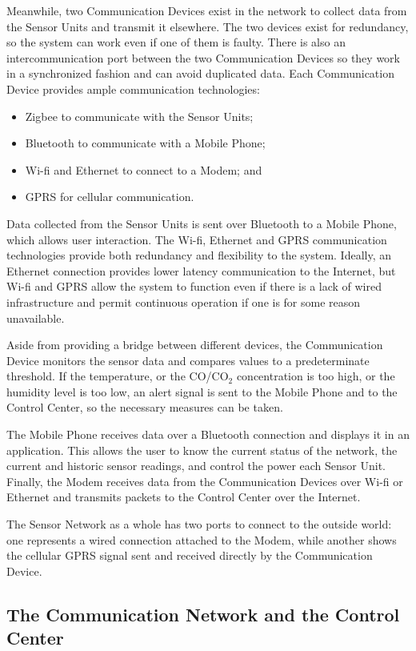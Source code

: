 Meanwhile, two Communication Devices exist in the network to collect data from the Sensor Units and transmit it elsewhere. The two devices exist for redundancy, so the system can work even if one of them is faulty. There is also an intercommunication port between the two Communication Devices so they work in a synchronized fashion and can avoid duplicated data. Each Communication Device provides ample communication technologies: 
\begin{itemize}
	\item Zigbee to communicate with the Sensor Units;
	\item Bluetooth to communicate with a Mobile Phone;
	\item Wi-fi and Ethernet to connect to a Modem; and
	\item GPRS for cellular communication.
\end{itemize}

Data collected from the Sensor Units is sent over Bluetooth to a Mobile Phone, which allows user interaction. The Wi-fi, Ethernet and GPRS communication technologies provide both redundancy and flexibility to the system. Ideally, an Ethernet connection provides lower latency communication to the Internet, but Wi-fi and GPRS allow the system to function even if there is a lack of wired infrastructure and permit continuous operation if one is for some reason unavailable.

Aside from providing a bridge between different devices, the Communication Device monitors the sensor data and compares values to a predeterminate threshold. If the temperature, or the CO/CO$_2$ concentration is too high, or the humidity level is too low, an alert signal is sent to the Mobile Phone and to the Control Center, so the necessary measures can be taken.

The Mobile Phone receives data over a Bluetooth connection and displays it in an application. This allows the user to know the current status of the network, the current and historic sensor readings, and control the power each Sensor Unit. Finally, the Modem receives data from the Communication Devices over Wi-fi or Ethernet and transmits packets to the Control Center over the Internet.

The Sensor Network as a whole has two ports to connect to the outside world: one represents a wired connection attached to the Modem, while another shows the cellular GPRS signal sent and received directly by the Communication Device.

\subsection{The Communication Network and the Control Center}

